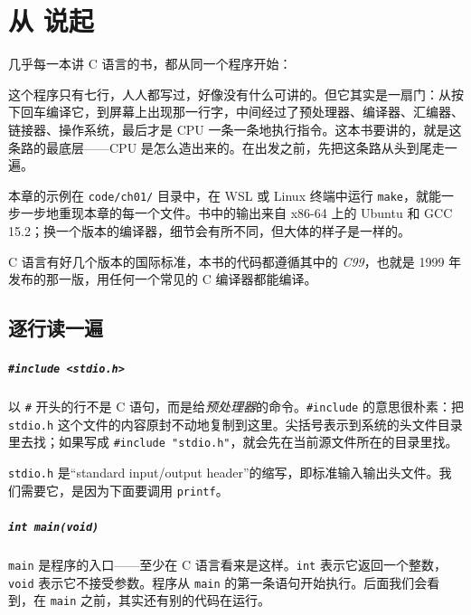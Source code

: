 \chapter{从 \texorpdfstring{}{Hello, world} 说起}
\label{chap:hello}

几乎每一本讲 C 语言的书，都从同一个程序开始：

这个程序只有七行，人人都写过，好像没有什么可讲的。但它其实是一扇门：从按下回车编译它，到屏幕上出现那一行字，中间经过了预处理器、编译器、汇编器、链接器、操作系统，最后才是 CPU 一条一条地执行指令。这本书要讲的，就是这条路的最底层——CPU 是怎么造出来的。在出发之前，先把这条路从头到尾走一遍。

本章的示例在 \texttt{code/ch01/} 目录中，在 WSL 或 Linux 终端中运行 \texttt{make}，就能一步一步地重现本章的每一个文件。书中的输出来自 x86-64 上的 Ubuntu 和 GCC 15.2；换一个版本的编译器，细节会有所不同，但大体的样子是一样的。

C 语言有好几个版本的国际标准，本书的代码都遵循其中的 \emph{C99}，也就是 1999 年发布的那一版，用任何一个常见的 C 编译器都能编译。

\section{逐行读一遍}

\paragraph{\texttt{\#include <stdio.h>}}
以 \texttt{\#} 开头的行不是 C 语句，而是给\emph{预处理器}的命令。\texttt{\#include} 的意思很朴素：把 \texttt{stdio.h} 这个文件的内容原封不动地复制到这里。尖括号表示到系统的头文件目录里去找；如果写成 \texttt{\#include "stdio.h"}，就会先在当前源文件所在的目录里找。

\texttt{stdio.h} 是“standard input/output header”的缩写，即标准输入输出头文件。我们需要它，是因为下面要调用 \texttt{printf}。

\paragraph{\texttt{int main(void)}}
\texttt{main} 是程序的入口——至少在 C 语言看来是这样。\texttt{int} 表示它返回一个整数，\texttt{void} 表示它不接受参数。程序从 \texttt{main} 的第一条语句开始执行。后面我们会看到，在 \texttt{main} 之前，其实还有别的代码在运行。

